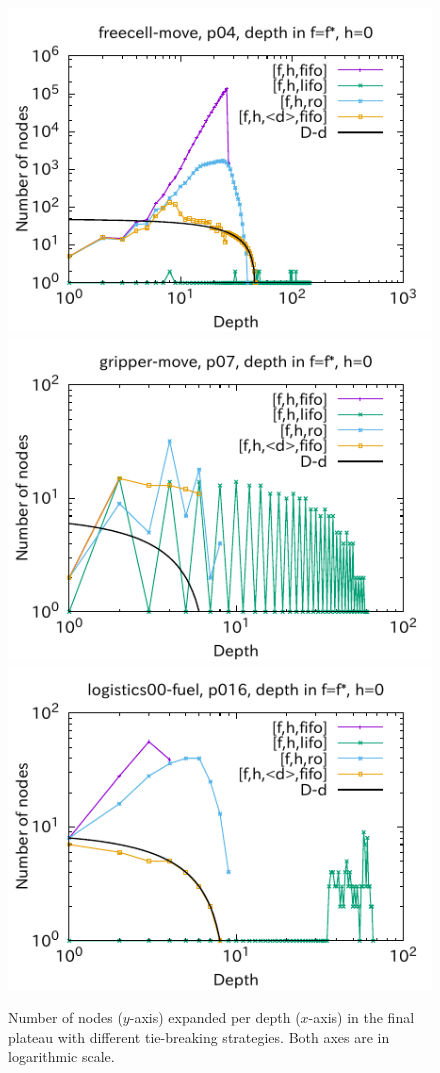 \begin{figure}[htbp]
\includegraphics{img/output-lmcut/freecell-move/p04-0.pdf}
\includegraphics{img/output-lmcut/gripper-move/p07-0.pdf}
\includegraphics{img/output-lmcut/logistics00-fuel/p016-0.pdf}
 \caption{Number of nodes ($y$-axis) expanded per depth ($x$-axis) in
 the final plateau with different tie-breaking strategies. Both axes are in logarithmic scale.
 }
 \label{fig:depth-histogram}
\end{figure}

